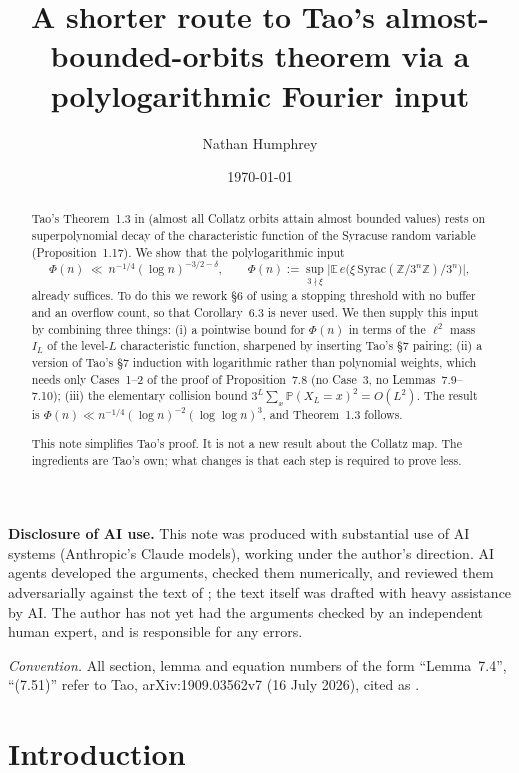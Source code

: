 \documentclass[11pt]{amsart}
\title[A shorter route to Tao's theorem]{A shorter route to Tao's almost-bounded-orbits theorem via a polylogarithmic Fourier input}
\author{Nathan Humphrey}
\date{\today}
\theoremstyle{remark}
\newcommand{\E}{\mathbb{E}}
\renewcommand{\P}{\mathbb{P}}
\newcommand{\Z}{\mathbb{Z}}
\newcommand{\e}{e}                       %
\newcommand{\Syrac}{\mathrm{Syrac}}
\newcommand{\Tc}{\cite{Tao22}}         %
\theoremstyle{plain}
\begin{document}
\begin{abstract}
Tao's Theorem~1.3 in \Tc{} (almost all Collatz orbits attain almost bounded values) rests on superpolynomial decay of the characteristic function of the Syracuse random variable (Proposition~1.17). We show that the polylogarithmic input
\[
\Phi(n)\ \ll\ n^{-1/4}(\log n)^{-3/2-\delta},\qquad
\Phi(n):=\sup_{3\nmid\xi}\Big|\E\, \e\big(\xi\,\Syrac(\Z/3^n\Z)/3^n\big)\Big|,
\]
already suffices. To do this we rework \S6 of \Tc{} using a stopping threshold with no buffer and an overflow count, so that Corollary~6.3 is never used. We then supply this input by combining three things: (i) a pointwise bound for $\Phi(n)$ in terms of the $\ell^2$ mass $I_L$ of the level-$L$ characteristic function, sharpened by inserting Tao's \S7 pairing; (ii) a version of Tao's \S7 induction with logarithmic rather than polynomial weights, which needs only Cases~1--2 of the proof of Proposition~7.8 (no Case~3, no Lemmas~7.9--7.10); (iii) the elementary collision bound $3^L\sum_x\P(X_L=x)^2=O(L^2)$. The result is $\Phi(n)\ll n^{-1/4}(\log n)^{-2}(\log\log n)^{3}$, and Theorem~1.3 follows.

This note simplifies Tao's proof. It is not a new result about the Collatz map. The ingredients are Tao's own; what changes is that each step is required to prove less.
\end{abstract}

\maketitle

\noindent\textbf{Disclosure of AI use.} This note was produced with substantial use of AI systems (Anthropic's Claude models), working under the author's direction. AI agents developed the arguments, checked them numerically, and reviewed them adversarially against the text of \Tc; the text itself was drafted with heavy assistance by AI. The author has not yet had the arguments checked by an independent human expert, and is responsible for any errors.

\medskip
\noindent\textit{Convention.} All section, lemma and equation numbers of the form ``Lemma~7.4'', ``(7.51)'' refer to Tao, arXiv:1909.03562v7 (16 July 2026), cited as \Tc.

\section{Introduction}
\end{document}
